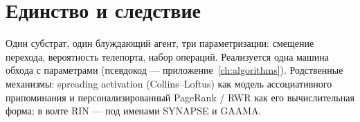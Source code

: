 \section{Единство и следствие}

Один субстрат, один блуждающий агент, три параметризации: смещение перехода,
вероятность телепорта, набор операций. Реализуется одна машина обхода с
параметрами (псевдокод --- приложение~\ref{ch:algorithms}). Родственные
механизмы: spreading activation (Collins--Loftus) как модель ассоциативного
припоминания и персонализированный PageRank / RWR как его вычислительная
форма; в волте RIN --- под именами SYNAPSE и GAAMA.
